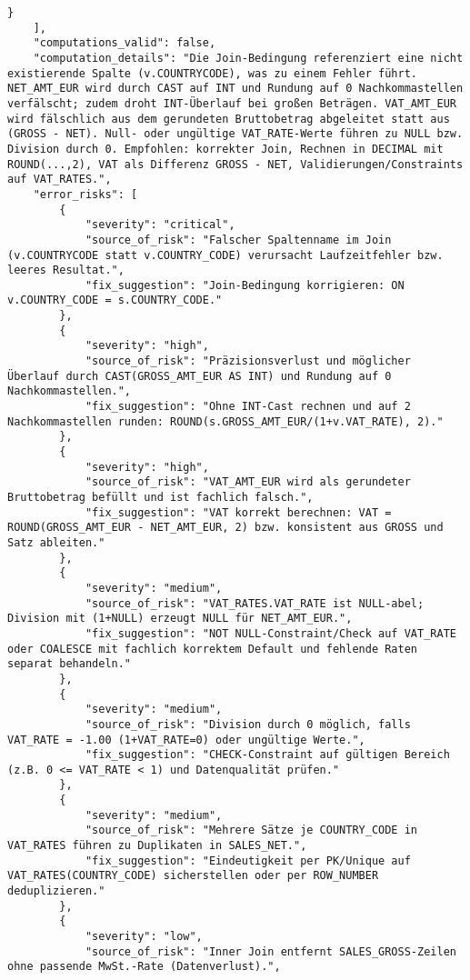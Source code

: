 \begin{lstlisting}[caption={Ausgabe: GPT-5 Anwendungsfall 5 Hauptdurchlauf},label={gpt_case5_prompt1}]
        }
    ],
    "computations_valid": false,
    "computation_details": "Die Join-Bedingung referenziert eine nicht existierende Spalte (v.COUNTRYCODE), was zu einem Fehler führt. NET_AMT_EUR wird durch CAST auf INT und Rundung auf 0 Nachkommastellen verfälscht; zudem droht INT-Überlauf bei großen Beträgen. VAT_AMT_EUR wird fälschlich aus dem gerundeten Bruttobetrag abgeleitet statt aus (GROSS - NET). Null- oder ungültige VAT_RATE-Werte führen zu NULL bzw. Division durch 0. Empfohlen: korrekter Join, Rechnen in DECIMAL mit ROUND(...,2), VAT als Differenz GROSS - NET, Validierungen/Constraints auf VAT_RATES.",
    "error_risks": [
        {
            "severity": "critical",
            "source_of_risk": "Falscher Spaltenname im Join (v.COUNTRYCODE statt v.COUNTRY_CODE) verursacht Laufzeitfehler bzw. leeres Resultat.",
            "fix_suggestion": "Join-Bedingung korrigieren: ON v.COUNTRY_CODE = s.COUNTRY_CODE."
        },
        {
            "severity": "high",
            "source_of_risk": "Präzisionsverlust und möglicher Überlauf durch CAST(GROSS_AMT_EUR AS INT) und Rundung auf 0 Nachkommastellen.",
            "fix_suggestion": "Ohne INT-Cast rechnen und auf 2 Nachkommastellen runden: ROUND(s.GROSS_AMT_EUR/(1+v.VAT_RATE), 2)."
        },
        {
            "severity": "high",
            "source_of_risk": "VAT_AMT_EUR wird als gerundeter Bruttobetrag befüllt und ist fachlich falsch.",
            "fix_suggestion": "VAT korrekt berechnen: VAT = ROUND(GROSS_AMT_EUR - NET_AMT_EUR, 2) bzw. konsistent aus GROSS und Satz ableiten."
        },
        {
            "severity": "medium",
            "source_of_risk": "VAT_RATES.VAT_RATE ist NULL-abel; Division mit (1+NULL) erzeugt NULL für NET_AMT_EUR.",
            "fix_suggestion": "NOT NULL-Constraint/Check auf VAT_RATE oder COALESCE mit fachlich korrektem Default und fehlende Raten separat behandeln."
        },
        {
            "severity": "medium",
            "source_of_risk": "Division durch 0 möglich, falls VAT_RATE = -1.00 (1+VAT_RATE=0) oder ungültige Werte.",
            "fix_suggestion": "CHECK-Constraint auf gültigen Bereich (z.B. 0 <= VAT_RATE < 1) und Datenqualität prüfen."
        },
        {
            "severity": "medium",
            "source_of_risk": "Mehrere Sätze je COUNTRY_CODE in VAT_RATES führen zu Duplikaten in SALES_NET.",
            "fix_suggestion": "Eindeutigkeit per PK/Unique auf VAT_RATES(COUNTRY_CODE) sicherstellen oder per ROW_NUMBER deduplizieren."
        },
        {
            "severity": "low",
            "source_of_risk": "Inner Join entfernt SALES_GROSS-Zeilen ohne passende MwSt.-Rate (Datenverlust).",

\end{lstlisting}
